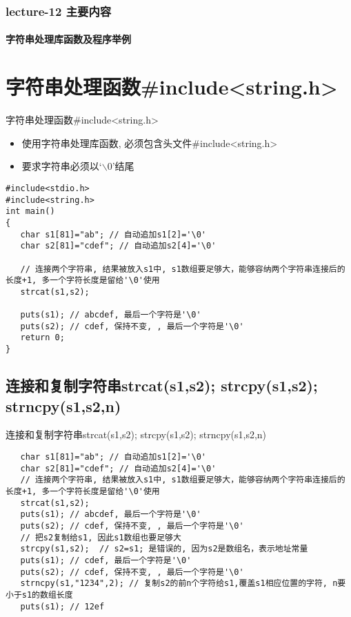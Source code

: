 \begin{frame}[shrink]
  \frametitle{lecture-12 主要内容}
  \framesubtitle{字符串处理库函数及程序举例}
  \tableofcontents
\end{frame}

\section{字符串处理函数\#include<string.h>}

\begin{frame}{字符串处理函数\#include<string.h>}
\begin{itemize}
	\item 使用字符串处理库函数, 必须包含头文件\#include<string.h>
	\item 要求字符串必须以`$\backslash$0'结尾
\end{itemize}
\begin{lstlisting}
#include<stdio.h>
#include<string.h>
int main()
{
   char s1[81]="ab"; // 自动追加s1[2]='\0'
   char s2[81]="cdef"; // 自动追加s2[4]='\0'
   
   // 连接两个字符串, 结果被放入s1中, s1数组要足够大，能够容纳两个字符串连接后的长度+1, 多一个字符长度是留给'\0'使用
   strcat(s1,s2); 
   
   puts(s1); // abcdef, 最后一个字符是'\0'
   puts(s2); // cdef, 保持不变, , 最后一个字符是'\0'
   return 0;
}
\end{lstlisting}
\end{frame}

\subsection{连接和复制字符串strcat(s1,s2); strcpy(s1,s2); strncpy(s1,s2,n)}

\begin{frame}{\small{连接和复制字符串strcat(s1,s2); strcpy(s1,s2); strncpy(s1,s2,n)}}
\begin{lstlisting}
   char s1[81]="ab"; // 自动追加s1[2]='\0'
   char s2[81]="cdef"; // 自动追加s2[4]='\0'
   // 连接两个字符串, 结果被放入s1中, s1数组要足够大，能够容纳两个字符串连接后的长度+1, 多一个字符长度是留给'\0'使用
   strcat(s1,s2); 
   puts(s1); // abcdef, 最后一个字符是'\0'
   puts(s2); // cdef, 保持不变, , 最后一个字符是'\0'
   // 把s2复制给s1, 因此s1数组也要足够大
   strcpy(s1,s2);  // s2=s1; 是错误的, 因为s2是数组名，表示地址常量
   puts(s1); // cdef, 最后一个字符是'\0'
   puts(s2); // cdef, 保持不变, , 最后一个字符是'\0'
   strncpy(s1,"1234",2); // 复制s2的前n个字符给s1,覆盖s1相应位置的字符, n要小于s1的数组长度
   puts(s1); // 12ef
\end{lstlisting}
\end{frame}

